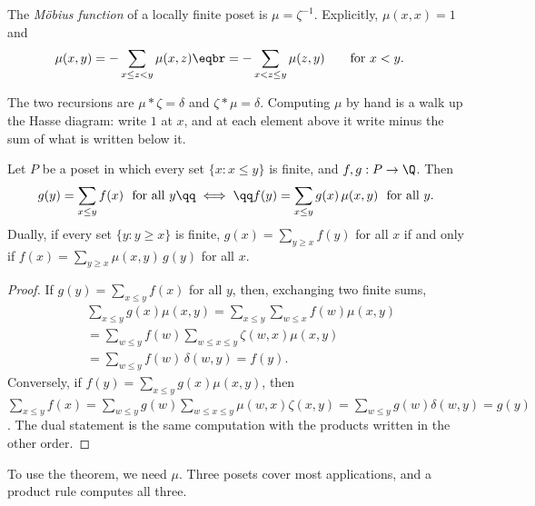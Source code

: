 \begin{definition}\label{def:mobius}
The \emph{M\"obius function} of a locally finite poset is $\mu=\zeta^{-1}$. Explicitly, $\mu(x,x)=1$ and
\[
\begin{aligned}{}&\mu(x,y)=-\sum_{x\le z<y}\mu(x,z)\eqbr=-\sum_{x<z\le y}\mu(z,y)\qquad\text{for }x<y.\end{aligned}
\]
\end{definition}

The two recursions are $\mu*\zeta=\delta$ and $\zeta*\mu=\delta$. Computing $\mu$ by hand is a walk up the Hasse diagram: write $1$ at $x$, and at
each element above it write minus the sum of what is written below it.

\begin{theorem}\label{thm:mobiusinv}
Let $P$ be a poset in which every set $\{x:x\le y\}$ is finite, and $f,g:P\to\Q$. Then
\[
\begin{gathered}g(y)=\sum_{x\le y}f(x)\ \text{ for all }y\qq\iff\qq f(y)=\sum_{x\le y}g(x)\,\mu(x,y)\ \text{ for all }y.\end{gathered}
\]
Dually, if every set $\{y:y\ge x\}$ is finite, $g(x)=\sum_{y\ge x}f(y)$ for all $x$ if and only if $f(x)=\sum_{y\ge x}\mu(x,y)\,g(y)$ for all $x$.
\end{theorem}
\begin{proof}
If $g(y)=\sum_{x\le y}f(x)$ for all $y$, then, exchanging two finite sums,
\[
\begin{aligned}{}&\sum_{x\le y}g(x)\mu(x,y)=\sum_{x\le y}\sum_{w\le x}f(w)\mu(x,y)\\&=\sum_{w\le y}f(w)\sum_{w\le x\le y}\zeta(w,x)\mu(x,y)\\&=\sum_{w\le y}f(w)\,\delta(w,y)=f(y).\end{aligned}
\]
Conversely, if $f(y)=\sum_{x\le y}g(x)\mu(x,y)$, then $\sum_{x\le y}f(x)=\sum_{w\le y}g(w)\sum_{w\le x\le y}\mu(w,x)\zeta(x,y)=\sum_{w\le y}g(w)\delta(w,y)=g(y)$.
The dual statement is the same computation with the products written in the other order.
\end{proof}

To use the theorem, we need $\mu$. Three posets cover most applications, and a product rule computes all three.

